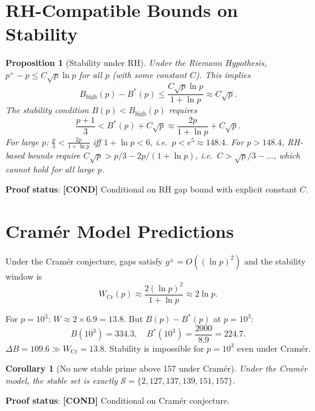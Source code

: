 \documentclass[11pt,a4paper]{article}
\newtheorem{proposition}{Proposition}
\newtheorem{corollary}{Corollary}
\newcommand{\cond}[1]{\textbf{[COND]} #1}
\newcommand{\Sc}{\mathcal{S}}
\begin{document}
\section{RH-Compatible Bounds on Stability}

\begin{proposition}[Stability under RH]
  Under the Riemann Hypothesis, $p^+ - p \leq C\sqrt{p}\ln p$ for all $p$
  (with some constant $C$).  This implies
  \[
    B_\mathrm{high}(p) - B^*(p) \leq \frac{C\sqrt{p}\ln p}{1+\ln p} \approx C\sqrt{p}.
  \]
  The stability condition $B(p) < B_\mathrm{high}(p)$ requires
  \[
    \frac{p+1}{3} < B^*(p) + C\sqrt{p}
    \approx \frac{2p}{1+\ln p} + C\sqrt{p}.
  \]
  For large $p$: $\frac{p}{3} < \frac{2p}{1+\ln p}$ iff $1+\ln p < 6$,
  i.e.\ $p < e^5 \approx 148.4$.  For $p > 148.4$, RH-based bounds
  require $C\sqrt{p} > p/3 - 2p/(1+\ln p)$, i.e.\ $C > \sqrt{p}/3 - \ldots$,
  which cannot hold for all large $p$.
\end{proposition}

\textbf{Proof status}: \cond{Conditional on RH gap bound with explicit constant $C$.}

\section{Cram\'er Model Predictions}

Under the Cram\'er conjecture, gaps satisfy $g^\pm = O((\ln p)^2)$ and the
stability window is
\[
  W_\mathrm{Cr}(p) \approx \frac{2(\ln p)^2}{1+\ln p} \approx 2\ln p.
\]

For $p = 10^3$: $W \approx 2 \times 6.9 = 13.8$.  But $B(p) - B^*(p)$ at
$p = 10^3$:
\[
  B(10^3) = 334.3, \quad B^*(10^3) = \frac{2000}{8.9} = 224.7.
\]
$\Delta B = 109.6 \gg W_\mathrm{Cr} = 13.8$.  Stability is impossible for
$p = 10^3$ even under Cram\'er.

\begin{corollary}[No new stable prime above 157 under Cram\'er]
  Under the Cram\'er model, the stable set is exactly
  $\Sc = \{2, 127, 137, 139, 151, 157\}$.
\end{corollary}

\textbf{Proof status}: \cond{Conditional on Cram\'er conjecture.}

\end{document}
